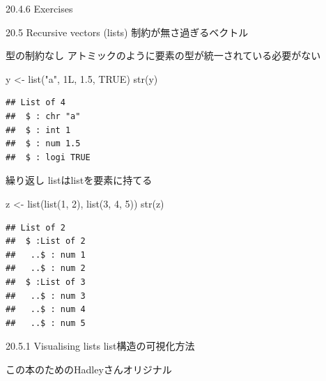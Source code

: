 \documentclass[
  ignorenonframetext,
]{beamer}
\newenvironment{Shaded}{\begin{snugshade}}{\end{snugshade}}
\newcommand{\ConstantTok}[1]{\textcolor[rgb]{0.00,0.00,0.00}{#1}}
\newcommand{\DecValTok}[1]{\textcolor[rgb]{0.00,0.00,0.81}{#1}}
\newcommand{\FloatTok}[1]{\textcolor[rgb]{0.00,0.00,0.81}{#1}}
\newcommand{\FunctionTok}[1]{\textcolor[rgb]{0.00,0.00,0.00}{#1}}
\newcommand{\NormalTok}[1]{#1}
\newcommand{\OtherTok}[1]{\textcolor[rgb]{0.56,0.35,0.01}{#1}}
\newcommand{\StringTok}[1]{\textcolor[rgb]{0.31,0.60,0.02}{#1}}
\begin{document}
\begin{frame}{20.4.6 Exercises}
\protect\hypertarget{exercises-1}{}
\end{frame}

\begin{frame}{20.5 Recursive vectors (lists)}
\protect\hypertarget{recursive-vectors-lists}{}
制約が無さ過ぎるベクトル
\end{frame}

\begin{frame}[fragile]{型の制約なし}
\protect\hypertarget{ux578bux306eux5236ux7d04ux306aux3057}{}
アトミックのように要素の型が統一されている必要がない

\begin{Shaded}
\begin{Highlighting}[]
\NormalTok{y }\OtherTok{\textless{}{-}} \FunctionTok{list}\NormalTok{(}\StringTok{"a"}\NormalTok{, 1L, }\FloatTok{1.5}\NormalTok{, }\ConstantTok{TRUE}\NormalTok{)}
\FunctionTok{str}\NormalTok{(y)}
\end{Highlighting}
\end{Shaded}

\begin{verbatim}
## List of 4
##  $ : chr "a"
##  $ : int 1
##  $ : num 1.5
##  $ : logi TRUE
\end{verbatim}
\end{frame}

\begin{frame}[fragile]{繰り返し}
\protect\hypertarget{ux7e70ux308aux8fd4ux3057}{}
listはlistを要素に持てる

\begin{Shaded}
\begin{Highlighting}[]
\NormalTok{z }\OtherTok{\textless{}{-}} \FunctionTok{list}\NormalTok{(}\FunctionTok{list}\NormalTok{(}\DecValTok{1}\NormalTok{, }\DecValTok{2}\NormalTok{), }\FunctionTok{list}\NormalTok{(}\DecValTok{3}\NormalTok{, }\DecValTok{4}\NormalTok{, }\DecValTok{5}\NormalTok{))}
\FunctionTok{str}\NormalTok{(z)}
\end{Highlighting}
\end{Shaded}

\begin{verbatim}
## List of 2
##  $ :List of 2
##   ..$ : num 1
##   ..$ : num 2
##  $ :List of 3
##   ..$ : num 3
##   ..$ : num 4
##   ..$ : num 5
\end{verbatim}
\end{frame}

\begin{frame}{20.5.1 Visualising lists}
\protect\hypertarget{visualising-lists}{}
list構造の可視化方法

この本のためのHadleyさんオリジナル
\end{frame}
\end{document}
